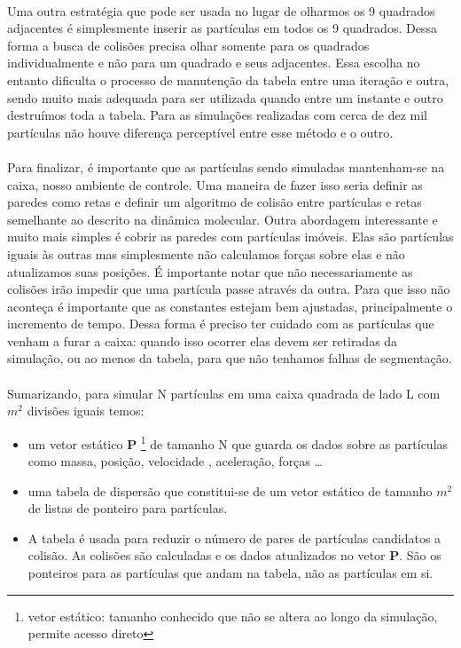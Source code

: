 \documentclass[a4paper,11pt]{article}
\begin{document}
\paragraph{}Uma outra estratégia que pode ser usada no lugar de olharmos os 9 quadrados
adjacentes é simplesmente inserir as partículas em todos
os 9 quadrados. Dessa forma a busca de colisões precisa olhar somente para os quadrados
individualmente e não para um quadrado e seus adjacentes. Essa escolha no entanto dificulta
o processo de manutenção da tabela entre uma iteração e outra, sendo muito mais adequada
para ser utilizada quando entre um instante e outro destruímos toda a tabela. Para as 
simulações realizadas com cerca de dez mil partículas não houve diferença perceptível entre
esse método e o outro. 

\paragraph{}Para finalizar, é importante que as partículas sendo simuladas mantenham-se
na caixa, nosso ambiente de controle. Uma maneira de fazer isso seria definir as paredes
como retas e definir um algoritmo de colisão entre partículas e retas semelhante
ao descrito na dinâmica molecular. Outra abordagem interessante e muito mais simples é
cobrir as paredes com partículas imóveis. Elas são partículas iguais às outras mas 
simplesmente não calculamos forças sobre elas e não atualizamos suas posições. É importante
notar que não necessariamente as colisões irão impedir que uma partícula passe através da 
outra. Para que isso não aconteça é importante que as constantes estejam bem ajustadas,
principalmente o incremento de tempo. Dessa forma é preciso ter cuidado com as partículas
que venham a furar a caixa: quando isso ocorrer elas devem ser retiradas da simulação, 
ou ao menos da tabela, para que não tenhamos falhas de segmentação.

\paragraph{}Sumarizando, para simular N partículas em uma caixa quadrada de lado L
com $m^2$ divisões iguais temos:
\begin{itemize}
  \item  um vetor estático \textbf{P}
  \footnote{vetor estático:
tamanho conhecido que não se altera ao longo da simulação, permite acesso direto} 
  de tamanho N que guarda os dados sobre as partículas como massa, posição, velocidade
 , aceleração, forças \ldots
  \item uma tabela de dispersão que constitui-se de um vetor estático de tamanho $m^2$
   de listas de ponteiro para partículas. 
   \item A tabela é usada para reduzir o número
   de pares de partículas candidatos a colisão. As colisões são calculadas e os dados
   atualizados no vetor \textbf{P}. São os ponteiros para as partículas que andam na tabela, 
   não as partículas em si.
\end{itemize} 
\end{document}
